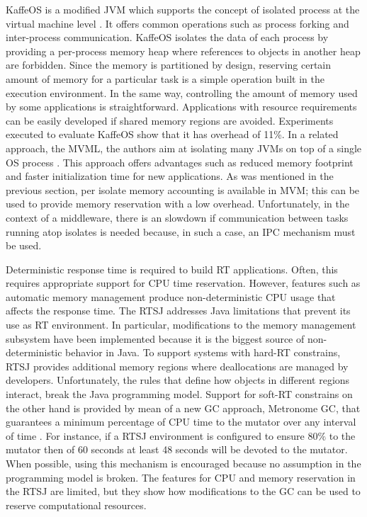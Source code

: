 KaffeOS is a modified JVM which supports the concept of isolated process at the virtual machine level \cite{back_processes_2000, Back:2005:KJR:1075382.1075383}.
It offers common operations such as process forking and inter-process communication.
KaffeOS isolates the data of each process by providing a per-process memory heap where references to objects in another heap are forbidden.
Since the memory is partitioned by design, reserving certain amount of memory for a particular task is a simple operation built in the execution environment.
In the same way, controlling the amount of memory used by some applications is straightforward.
Applications with resource requirements can be easily developed if shared memory regions are avoided.
Experiments executed to evaluate KaffeOS show that it has overhead of 11\%.
In a related approach, the \gls{MVML}, the authors aim at isolating many JVMs on top of
a single OS process \cite{czajkowski_multitasking_2001}.
This approach offers advantages such as reduced memory footprint and faster initialization time for new applications.
As was mentioned in the previous section, per isolate memory accounting is available in MVM;
this can be used to provide memory reservation with a low overhead. 
Unfortunately, in the context of a middleware, there is an slowdown if communication between tasks running atop isolates is needed because, in such a case, an \gls{IPC} mechanism must be used.


Deterministic response time is required to build \gls{RT} applications.
Often, this requires appropriate support for CPU time reservation. 
However, features such as automatic memory management produce non-deterministic CPU usage that affects the response time.
The \gls{RTSJ} addresses Java limitations that prevent its use as RT environment.
In particular, modifications to the memory management subsystem have been implemented because it is the biggest source of non-deterministic behavior in Java.
To support systems with hard-RT constrains, RTSJ provides additional memory regions where deallocations are managed by developers.
Unfortunately, the rules that define how objects in different regions interact, break the Java programming model.
Support for soft-RT constrains on the other hand is provided by mean of a new GC approach, Metronome GC,  that guarantees a minimum percentage of CPU time to the mutator over any interval of time \cite{Bacon03themetronome:}.
For instance, if a RTSJ environment is configured to ensure 80$\%$ to the mutator then of 60 seconds at least 48 seconds will be devoted to the mutator.
When possible, using this mechanism is encouraged because no assumption in the programming model is broken.
The features for CPU and memory reservation in the RTSJ are limited, but they show how modifications to the GC can be used to reserve computational resources. 

